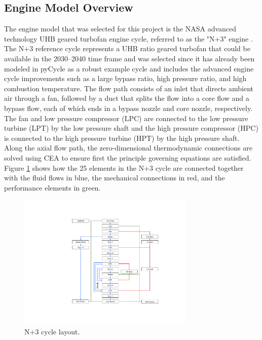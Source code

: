 \documentclass[12pt]{new-aiaa}
\begin{document}
\subsection{Engine Model Overview}
The engine model that was selected for this project is the NASA advanced technology UHB geared turbofan engine cycle, referred to as the "N+3" engine \cite{Jones2017a}.
The N+3 reference cycle represents a UHB ratio geared turbofan that could be available in the 2030–2040 time frame and was selected since it has already been modeled in pyCycle as a robust example cycle and includes the advanced engine cycle improvements such as a large bypass ratio, high pressure ratio, and high combustion temperature.
The flow path consists of an inlet that directs ambient air through a fan, followed by a duct that splits the flow into a core flow and a bypass flow, each of which ends in a bypass nozzle and core nozzle, respectively.
The fan and low pressure compressor (LPC) are connected to the low pressure turbine (LPT) by the low pressure shaft and the high pressure compressor (HPC) is connected to the high pressure turbine (HPT) by the high pressure shaft.
Along the axial flow path, the zero-dimensional thermodynamic connections are solved using CEA to ensure first the principle governing equations are satisfied.
Figure \ref{fig:N3_original} shows how the 25 elements in the N+3 cycle are connected together with the fluid flows in blue, the mechanical connections in red, and the performance elements in green.

\begin{figure}[!hbt]
    \centering
    \includegraphics[width=0.75\textwidth]{N3_diagram.pdf}
    \caption{N+3 cycle layout.}
    \label{fig:N3_original}
\end{figure}
\end{document}
